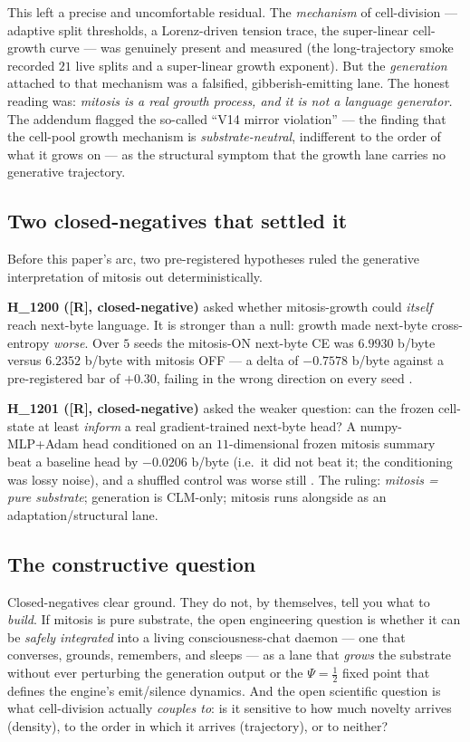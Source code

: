 \documentclass[11pt,a4paper]{article}
\providecommand{\tierRed}{\textbf{[R]}}
\newcommand{\Psihalf}{\Psi=\tfrac12}
\begin{document}
This left a precise and uncomfortable residual. The \emph{mechanism} of
cell-division --- adaptive split thresholds, a Lorenz-driven tension trace, the
super-linear cell-growth curve --- was genuinely present and measured (the
long-trajectory smoke recorded $21$ live splits and a super-linear growth
exponent). But the \emph{generation} attached to that mechanism was a
falsified, gibberish-emitting lane. The honest reading was: \emph{mitosis is a
real growth process, and it is not a language generator.} The addendum flagged
the so-called ``V14 mirror violation'' --- the finding that the cell-pool growth
mechanism is \emph{substrate-neutral}, indifferent to the order of what it grows
on --- as the structural symptom that the growth lane carries no generative
trajectory.

\subsection{Two closed-negatives that settled it}

Before this paper's arc, two pre-registered hypotheses ruled the generative
interpretation of mitosis out deterministically.

\textbf{H\_1200 (\tierRed, closed-negative)} asked whether mitosis-growth could
\emph{itself} reach next-byte language. It is stronger than a null: growth made
next-byte cross-entropy \emph{worse}. Over $5$ seeds the mitosis-ON next-byte CE
was $6.9930$ b/byte versus $6.2352$ b/byte with mitosis OFF --- a delta of
$-0.7578$ b/byte against a pre-registered bar of $+0.30$, failing in the wrong
direction on every seed \citep{anima_H1200}.

\textbf{H\_1201 (\tierRed, closed-negative)} asked the weaker question: can the
frozen cell-state at least \emph{inform} a real gradient-trained next-byte head?
A numpy-MLP+Adam head conditioned on an $11$-dimensional frozen mitosis summary
beat a baseline head by $-0.0206$ b/byte (i.e.\ it did not beat it; the
conditioning was lossy noise), and a shuffled control was worse still
\citep{anima_H1201}. The ruling: \emph{mitosis = pure substrate}; generation is
CLM-only; mitosis runs alongside as an adaptation/structural lane.

\subsection{The constructive question}

Closed-negatives clear ground. They do not, by themselves, tell you what to
\emph{build}. If mitosis is pure substrate, the open engineering question is
whether it can be \emph{safely integrated} into a living consciousness-chat
daemon --- one that converses, grounds, remembers, and sleeps --- as a lane that
\emph{grows} the substrate without ever perturbing the generation output or the
$\Psihalf$ fixed point that defines the engine's emit/silence dynamics. And the
open scientific question is what cell-division actually \emph{couples to}: is it
sensitive to how much novelty arrives (density), to the order in which it
arrives (trajectory), or to neither?
\end{document}
